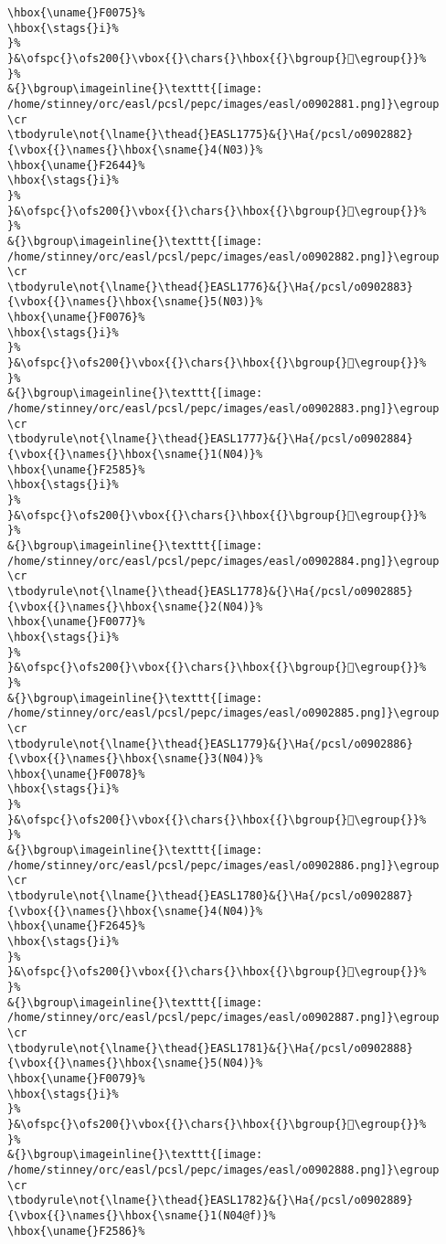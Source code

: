 \begin{verbatim}
\hbox{\uname{}F0075}%
\hbox{\stags{}i}%
}%
}&\ofspc{}\ofs200{}\vbox{{}\chars{}\hbox{{}\bgroup{}󰁵\egroup{}}%
}%
&{}\bgroup\imageinline{}\texttt{[image: /home/stinney/orc/easl/pcsl/pepc/images/easl/o0902881.png]}\egroup
\cr
\tbodyrule\not{\lname{}\thead{}EASL1775}&{}\Ha{/pcsl/o0902882}{\vbox{{}\names{}\hbox{\sname{}4(N03)}%
\hbox{\uname{}F2644}%
\hbox{\stags{}i}%
}%
}&\ofspc{}\ofs200{}\vbox{{}\chars{}\hbox{{}\bgroup{}󲙄\egroup{}}%
}%
&{}\bgroup\imageinline{}\texttt{[image: /home/stinney/orc/easl/pcsl/pepc/images/easl/o0902882.png]}\egroup
\cr
\tbodyrule\not{\lname{}\thead{}EASL1776}&{}\Ha{/pcsl/o0902883}{\vbox{{}\names{}\hbox{\sname{}5(N03)}%
\hbox{\uname{}F0076}%
\hbox{\stags{}i}%
}%
}&\ofspc{}\ofs200{}\vbox{{}\chars{}\hbox{{}\bgroup{}󰁶\egroup{}}%
}%
&{}\bgroup\imageinline{}\texttt{[image: /home/stinney/orc/easl/pcsl/pepc/images/easl/o0902883.png]}\egroup
\cr
\tbodyrule\not{\lname{}\thead{}EASL1777}&{}\Ha{/pcsl/o0902884}{\vbox{{}\names{}\hbox{\sname{}1(N04)}%
\hbox{\uname{}F2585}%
\hbox{\stags{}i}%
}%
}&\ofspc{}\ofs200{}\vbox{{}\chars{}\hbox{{}\bgroup{}󲖅\egroup{}}%
}%
&{}\bgroup\imageinline{}\texttt{[image: /home/stinney/orc/easl/pcsl/pepc/images/easl/o0902884.png]}\egroup
\cr
\tbodyrule\not{\lname{}\thead{}EASL1778}&{}\Ha{/pcsl/o0902885}{\vbox{{}\names{}\hbox{\sname{}2(N04)}%
\hbox{\uname{}F0077}%
\hbox{\stags{}i}%
}%
}&\ofspc{}\ofs200{}\vbox{{}\chars{}\hbox{{}\bgroup{}󰁷\egroup{}}%
}%
&{}\bgroup\imageinline{}\texttt{[image: /home/stinney/orc/easl/pcsl/pepc/images/easl/o0902885.png]}\egroup
\cr
\tbodyrule\not{\lname{}\thead{}EASL1779}&{}\Ha{/pcsl/o0902886}{\vbox{{}\names{}\hbox{\sname{}3(N04)}%
\hbox{\uname{}F0078}%
\hbox{\stags{}i}%
}%
}&\ofspc{}\ofs200{}\vbox{{}\chars{}\hbox{{}\bgroup{}󰁸\egroup{}}%
}%
&{}\bgroup\imageinline{}\texttt{[image: /home/stinney/orc/easl/pcsl/pepc/images/easl/o0902886.png]}\egroup
\cr
\tbodyrule\not{\lname{}\thead{}EASL1780}&{}\Ha{/pcsl/o0902887}{\vbox{{}\names{}\hbox{\sname{}4(N04)}%
\hbox{\uname{}F2645}%
\hbox{\stags{}i}%
}%
}&\ofspc{}\ofs200{}\vbox{{}\chars{}\hbox{{}\bgroup{}󲙅\egroup{}}%
}%
&{}\bgroup\imageinline{}\texttt{[image: /home/stinney/orc/easl/pcsl/pepc/images/easl/o0902887.png]}\egroup
\cr
\tbodyrule\not{\lname{}\thead{}EASL1781}&{}\Ha{/pcsl/o0902888}{\vbox{{}\names{}\hbox{\sname{}5(N04)}%
\hbox{\uname{}F0079}%
\hbox{\stags{}i}%
}%
}&\ofspc{}\ofs200{}\vbox{{}\chars{}\hbox{{}\bgroup{}󰁹\egroup{}}%
}%
&{}\bgroup\imageinline{}\texttt{[image: /home/stinney/orc/easl/pcsl/pepc/images/easl/o0902888.png]}\egroup
\cr
\tbodyrule\not{\lname{}\thead{}EASL1782}&{}\Ha{/pcsl/o0902889}{\vbox{{}\names{}\hbox{\sname{}1(N04@f)}%
\hbox{\uname{}F2586}%

\end{verbatim}
